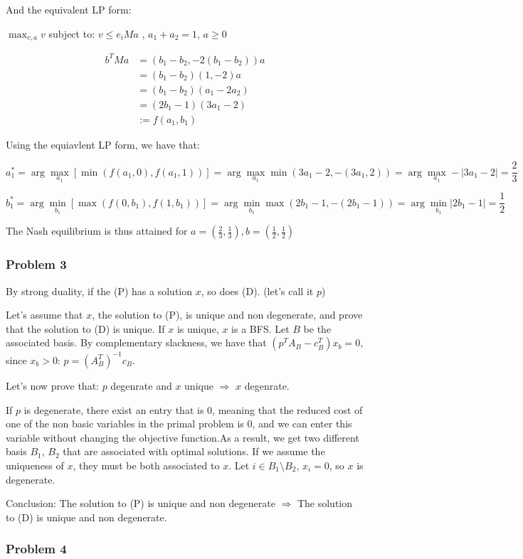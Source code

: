 \documentclass[12pt]{article}
\newcommand{\Q}[1]{\subsubsection*{Problem #1}}
\begin{document}
And the equivalent LP form:

$\max_{v,a} v$ subject to: $ v \leq e_i M a$ , $a_1 + a_2 = 1$, $a \geq 0$



\begin{align}
b^T M a &= (b_1 - b_2, -2(b_1 - b_2)) a \\&= (b_1-b_2)(1, -2)a \\&= (b_1 - b_2)(a_1 -2a_2) \\&= (2b_1 -1)(3a_1 - 2)\\&:=f(a_1, b_1)
\end{align}

Using the equiavlent LP form, we have that:

$$a_1^* = \arg\max_{a_1} \left[\min(f(a_1, 0), f(a_1, 1))\right] = \arg\max_{a_1} \min(3a_1 - 2, -(3a_1, 2)) = \arg\max_{a_1} - |3a_1 - 2| = \frac 2 3$$

$$b_1^* = \arg\min_{b_1} \left[\max(f(0, b_1), f(1, b_1))\right] = \arg\min_{b_1} \max(2b_1-1, -(2b_1-1)) = \arg\min_{b_1}  |2b_1-1| = \frac 1 2$$


The Nash equilibrium is thus attained for 
$a = (\frac 2 3, \frac 1 3), b = (\frac1 2, \frac 1 2)$



\Q{3}

By strong duality, if the (P) has a solution $x$, so does (D). (let's call it $p$)

Let's assume that $x$, the solution to (P), is unique and non degenerate, and prove that the solution to (D) is unique.
If $x$ is unique, $x$ is a BFS. Let $B$ be the associated basis. 
By complementary slackness, we have that $(p^TA_B - c_B^T) x_b = 0$, since $x_b > 0$: $p = (A_B^T)^{-1}c_B$.


Let's now prove that: $p$ degenrate and $x$ unique $\Rightarrow$ $x$ degenrate.

If $p$ is degenerate, there exist an entry that is $0$, meaning that the reduced cost of one of the non basic variables in the primal problem is $0$, and we can enter this variable without changing the objective function.As a result, we get two different basis $B_1$, $B_2$ that are associated with optimal solutions. If we assume the uniqueness of $x$, they must be both associated to $x$.
Let $i \in B_1 \setminus B_2$, $x_i = 0$, so $x$ is degenerate.


Conclusion: The solution to (P) is unique and non degenerate $\Rightarrow$ The solution to (D) is unique and non degenerate.
\Q{4}
\end{document}
